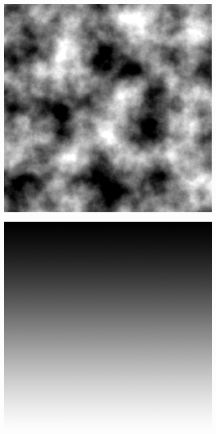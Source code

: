 \begin{figure}[H]
	\begin{minipage}[b]{.32\linewidth}
		\includegraphics[width=0.95\linewidth]{img/Perlin}
		\label{fig:5a}
	\end{minipage}
	\begin{minipage}[b]{.32\linewidth}
		\includegraphics[width=0.95\linewidth]{img/Latitude}

\end{minipage}
\end{figure}
